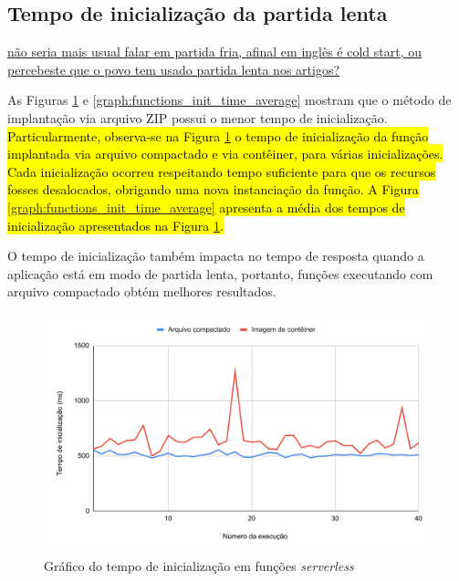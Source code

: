 \documentclass[conference]{IEEEtran}
\begin{document}
\subsection{Tempo de inicialização da partida lenta} \ul{não seria mais usual falar em partida fria, afinal em inglês é cold start, ou percebeste que o povo tem usado partida lenta nos artigos?}
\label{subsec:cold_start_time}

As Figuras \ref{graph:functions_init_time} e \ref{graph:functions_init_time_average} mostram que o método de implantação via arquivo ZIP possui o menor tempo de inicialização. \hl{Particularmente, observa-se na Figura \mbox{\ref{graph:functions_init_time}} o tempo de inicialização da função implantada via arquivo compactado e via contêiner, para várias inicializações. Cada inicialização ocorreu respeitando tempo suficiente para que os recursos fosses desalocados, obrigando uma nova instanciação da função. A Figura \mbox{\ref{graph:functions_init_time_average}} apresenta a média dos tempos de inicialização apresentados na Figura \mbox{\ref{graph:functions_init_time}}.}

O tempo de inicialização também impacta no tempo de resposta quando a aplicação está em modo de partida lenta, portanto, funções executando com arquivo compactado obtém melhores resultados.

\begin{figure}[H]
    \centering 
    \includegraphics [width=\linewidth]{images/init-time-PT.pdf}
    \par
    \caption{Gráfico do tempo de inicialização em funções \textit{serverless}}
    \label{graph:functions_init_time}
\end{figure}
\end{document}
